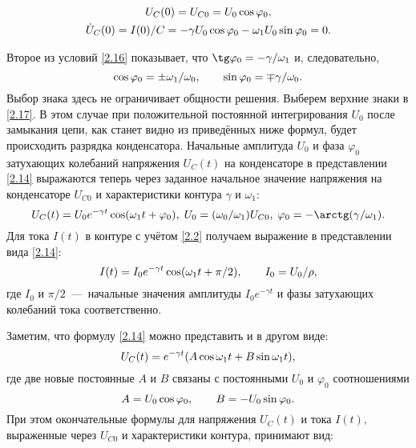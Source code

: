 \begin{equation}
	\eqmark{2.16}
		\begin{gathered}[c]
			U_C(0)=U_{C0}=U_0\cos\varphi_0, \\
			\dot{U}_C(0)=I(0)/C=-\gamma U_0\cos\varphi_0-\omega_1U_0\sin\varphi_0=0.
		\end{gathered}
\end{equation}

Второе из условий \eqref{2.16} показывает, что $\tg\varphi_0=-\gamma/\omega_1$ и, следовательно,
\begin{equation}\eqmark{2.17}
\cos\varphi_0=\pm\omega_1/\omega_0, \qquad \sin\varphi_0=\mp\gamma/\omega_0.
\end{equation}
Выбор знака здесь не ограничивает общности решения. Выберем верхние знаки в \eqref{2.17}. В этом случае при положительной постоянной интегрирования $U_0$ после замыкания цепи, как станет видно из приведённых ниже формул, будет происходить разрядка конденсатора. Начальные амплитуда $U_0$ и фаза $\varphi_0$ затухающих колебаний напряжения $U_C(t)$ на конденсаторе в представлении \eqref{2.14} выражаются теперь через заданное начальное значение напряжения на конденсаторе $U_{C0}$ и характеристики контура $\gamma$ и $\omega_1:$
\begin{equation}\eqmark{2.18}
U_C(t)=U_0e^{-\gamma t}\cos(\omega_1t+\varphi_0), \; U_0=(\omega_0/\omega_1)U_{C0}, \; \varphi_0=-\arctg(\gamma/\omega_1).
\end{equation}
Для тока $I(t)$ в контуре с учётом \eqref{2.2} получаем выражение в представлении вида \eqref{2.14}:
\begin{equation}\eqmark{2.19}
I(t)=I_0e^{-\gamma t}\cos(\omega_1t+\pi/2), \qquad I_0=U_0/\rho,
\end{equation}
где $I_0$ и $\pi/2$~---~начальные значения амплитуды $I_0e^{-\gamma t}$ и фазы затухающих колебаний тока соответственно.

Заметим, что формулу \eqref{2.14} можно представить и в другом виде:			
\begin{equation}\eqmark{2.20}
U_C(t)=e^{-\gamma t}(A\cos\omega_1 t+B\sin\omega_1 t),
\end{equation}
где две новые постоянные $A$ и $B$ связаны с постоянными $U_0$ и $\varphi_0$ соотношениями
\begin{equation}\eqmark{2.21}
A=U_0\cos\varphi_0, \qquad B=-U_0\sin\varphi_0.
\end{equation}
При этом окончательные формулы для напряжения $U_C(t)$ и тока $I(t),$ выраженные через $U_{C0}$ и характеристики контура, принимают вид:

